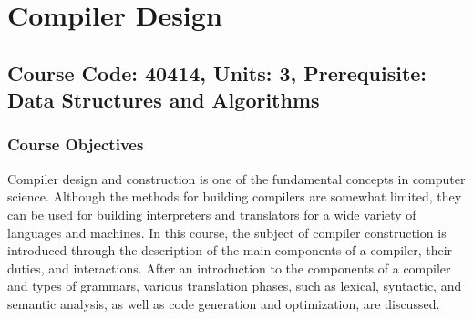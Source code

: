 \documentclass[12pt]{article}
\begin{document}
\newpage

\section{Compiler Design}
\subsection*{Course Code: 40414, Units: 3, Prerequisite: Data Structures and Algorithms}

\subsubsection*{Course Objectives}
Compiler design and construction is one of the fundamental concepts in computer science. Although the methods for building compilers are somewhat limited, they can be used for building interpreters and translators for a wide variety of languages and machines. In this course, the subject of compiler construction is introduced through the description of the main components of a compiler, their duties, and interactions. After an introduction to the components of a compiler and types of grammars, various translation phases, such as lexical, syntactic, and semantic analysis, as well as code generation and optimization, are discussed.
\end{document}
